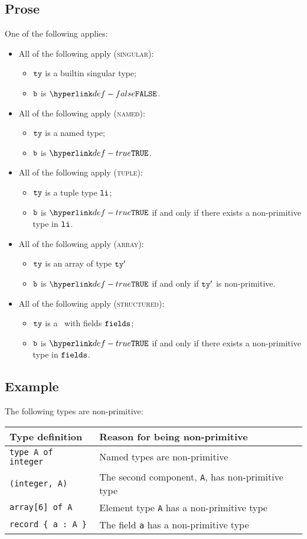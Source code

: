 \subsection{Prose}
One of the following applies:
\begin{itemize}
  \item All of the following apply (\textsc{singular}):
  \begin{itemize}
  \item $\texttt{ty}$ is a builtin singular type;
  \item $\texttt{b}$ is $\False$.
  \end{itemize}
  \item All of the following apply (\textsc{named}):
  \begin{itemize}
    \item $\texttt{ty}$ is a named type;
    \item $\texttt{b}$ is $\True$.
  \end{itemize}
  \item All of the following apply (\textsc{tuple}):
  \begin{itemize}
    \item $\texttt{ty}$ is a tuple type $\texttt{li}$;
    \item $\texttt{b}$ is $\True$ if and only if there exists a non-primitive type in $\texttt{li}$.
  \end{itemize}
  \item All of the following apply (\textsc{array}):
    \begin{itemize}
    \item $\texttt{ty}$ is an array of type $\texttt{ty}'$
    \item $\texttt{b}$ is $\True$ if and only if $\texttt{ty}'$ is non-primitive.
    \end{itemize}
  \item All of the following apply (\textsc{structured}):
    \begin{itemize}
    \item $\texttt{ty}$ is a \structuredtype\ with fields $\texttt{fields}$;
    \item $\texttt{b}$ is $\True$ if and only if there exists a non-primitive type in $\texttt{fields}$.
    \end{itemize}
\end{itemize}

\subsection{Example}
The following types are non-primitive:

\begin{tabular}{ll}
\textbf{Type definition} & \textbf{Reason for being non-primitive}\\
\hline
\texttt{type A of integer}  & Named types are non-primitive\\
\texttt{(integer, A)}       & The second component, \texttt{A}, has non-primitive type\\
\texttt{array[6] of A}      & Element type \texttt{A} has a non-primitive type\\
\verb|record { a : A }|     & The field \texttt{a} has a non-primitive type
\end{tabular}

